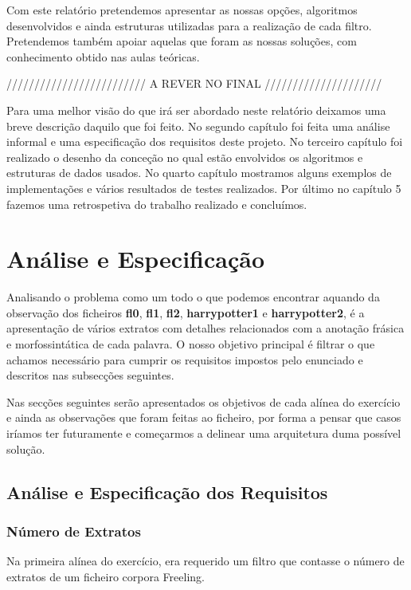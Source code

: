 \documentclass[11pt,a4paper]{report}
\begin{document}
Com este relatório pretendemos apresentar as nossas opções, algoritmos desenvolvidos e ainda estruturas utilizadas para a realização de cada filtro. Pretendemos também apoiar aquelas que foram as nossas soluções, com conhecimento obtido nas aulas teóricas.

///////////////////////// A REVER NO FINAL /////////////////////

Para uma melhor visão do que irá ser abordado neste relatório deixamos uma breve descrição daquilo que foi feito. No segundo capítulo foi feita uma análise informal e uma especificação dos requisitos deste projeto. No terceiro capítulo foi realizado o desenho da conceção no qual estão envolvidos os algoritmos e estruturas de dados usados. No quarto capítulo mostramos alguns exemplos de implementações e vários resultados de testes realizados. Por último no capítulo 5 fazemos uma retrospetiva do trabalho realizado e concluímos.



\chapter{Análise e Especificação}
\label{chap:analise}

Analisando o problema como um todo o que podemos encontrar aquando da observação dos ficheiros \textbf{fl0}, \textbf{fl1}, \textbf{fl2}, \textbf{harrypotter1} e \textbf{harrypotter2}, é a apresentação de vários extratos com detalhes relacionados com a anotação frásica e morfossintática de cada palavra. O nosso objetivo principal é filtrar o que achamos necessário para cumprir os requisitos impostos pelo enunciado e descritos nas subsecções seguintes.

Nas secções seguintes serão apresentados os objetivos de cada alínea do exercício e ainda as observações que foram feitas ao ficheiro, por forma a pensar que casos iríamos ter futuramente e começarmos a delinear uma arquitetura duma possível solução.

\section{Análise e Especificação dos Requisitos}
\subsection{Número de Extratos}
\label{subsec:analise1}

Na primeira alínea do exercício, era requerido um filtro que contasse o número de extratos de um ficheiro corpora Freeling.
\end{document}

